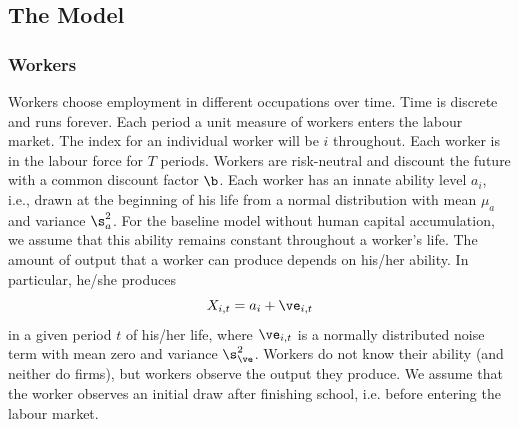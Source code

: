 \documentclass[12pt]{article}
\theoremstyle{definition}
\begin{document}
\subsection{The Model}

\subsubsection{Workers}

Workers choose employment in different occupations over time. Time is discrete and runs forever. Each period a unit measure of workers enters the labour market. The index for an individual worker will be $i$ throughout. Each worker is in the labour force for $T$ periods. Workers are risk-neutral and discount the future with a common discount factor $\b$. Each worker has an innate ability level $a_i$, i.e., drawn at the beginning of his life from a normal distribution with mean $\mu_a$ and variance $\s_a^2$. For the baseline model without human capital accumulation, we assume that this ability remains constant throughout a worker's life. The amount of output that a worker can produce depends on his/her ability. In particular, he/she produces 
\begin{equation}
    \label{groesUShapesOccupationalMobility2015_eq2}
    X_{i,t} = a_{i} + \ve_{i,t}
\end{equation}
in a given period $t$ of his/her life, where $\ve_{i,t}$ is a normally distributed noise term with mean zero and variance $\s_{\ve}^{2}$. Workers do not know their ability (and neither do firms), but workers observe the output they produce. We assume that the worker observes an initial draw after finishing school, i.e. before entering the labour market.
\end{document}
